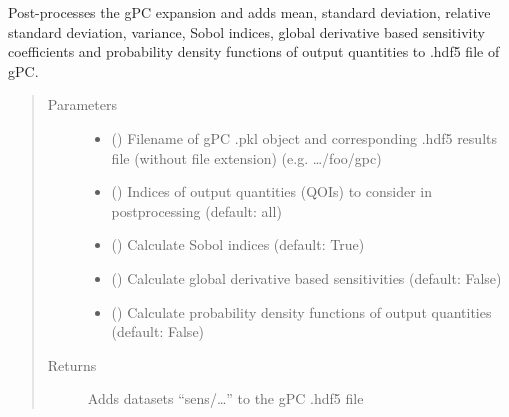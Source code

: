 \documentclass[letterpaper,10pt,english,openany,oneside]{sphinxmanual}
\begin{document}
\begin{fulllineitems}
\label{\detokenize{pygpc:pygpc.postprocessing.get_sensitivities_hdf5}}
Post-processes the gPC expansion and adds mean, standard deviation, relative standard deviation, variance, Sobol
indices, global derivative based sensitivity coefficients and probability density functions of output quantities to
.hdf5 file of gPC.
\begin{quote}\begin{description}
\item[{Parameters}] \leavevmode\begin{itemize}
\item {} 
 () \textendash{} Filename of gPC .pkl object and corresponding .hdf5 results file (without file extension)
(e.g. …/foo/gpc)

\item {} 
 () \textendash{} Indices of output quantities (QOIs) to consider in postprocessing (default: all)

\item {} 
 () \textendash{} Calculate Sobol indices (default: True)

\item {} 
 () \textendash{} Calculate global derivative based sensitivities (default: False)

\item {} 
 () \textendash{} Calculate probability density functions of output quantities (default: False)

\end{itemize}

\item[{Returns}] \leavevmode
{} \textendash{} Adds datasets “sens/…” to the gPC .hdf5 file


\end{description}
\end{quote}
\end{fulllineitems}
\end{document}

